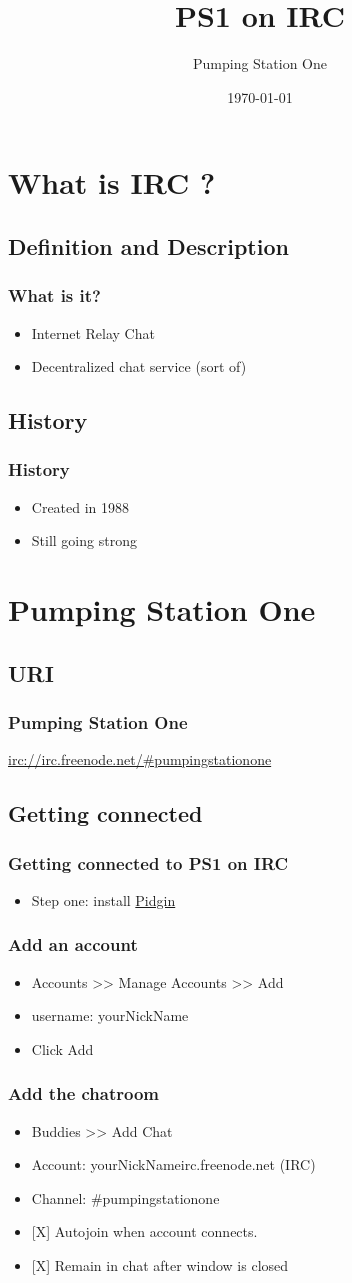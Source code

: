 \documentclass[hyperref={pdfpagelabels=false}]{beamer}
\title{PS1 on IRC}
\author{Pumping Station One}
\date{\today}
\begin{document}
\frame{\titlepage}
\section[Outline]{}
\frame{\tableofcontents}
\section{What is IRC ?}
	\subsection{Definition and Description}
		\frame
		{
			\frametitle{What is it?}
			\begin{itemize}
				\item{Internet Relay Chat}
				\item{Decentralized chat service (sort of)}
			\end{itemize}
		}

	\subsection{History}
		\frame
		{
			\frametitle{History}
			\begin{itemize}
				\item{Created in 1988}
				\item{Still going strong}
			\end{itemize}
		}
\section{Pumping Station One}
	\subsection{URI}
		\frame
		{
			\frametitle{Pumping Station One}
			\url{irc://irc.freenode.net/\#pumpingstationone}
		}
	\subsection{Getting connected}
		\frame
		{
			\frametitle{Getting connected to PS1 on IRC}
			\begin{itemize}
				\item{Step one: install \href{http://pidgin.im}{Pidgin}}
			\end{itemize}
		}
		\frame
		{
			\frametitle{Add an account}
			\begin{itemize}
				\item{Accounts >> Manage Accounts >> Add}
				\item{username: yourNickName}
				\item{Click Add}
			\end{itemize}
		}
		\frame
		{
			\frametitle{Add the chatroom}
			\begin{itemize}
				\item{Buddies >> Add Chat}
				\item{Account: yourNickName\makeatletter@\makeatother irc.freenode.net (IRC)}
				\item{Channel: \#pumpingstationone}
				\item{[X] Autojoin when account connects.}
				\item{[X] Remain in chat after window is closed}
			\end{itemize}
		}
\end{document}
